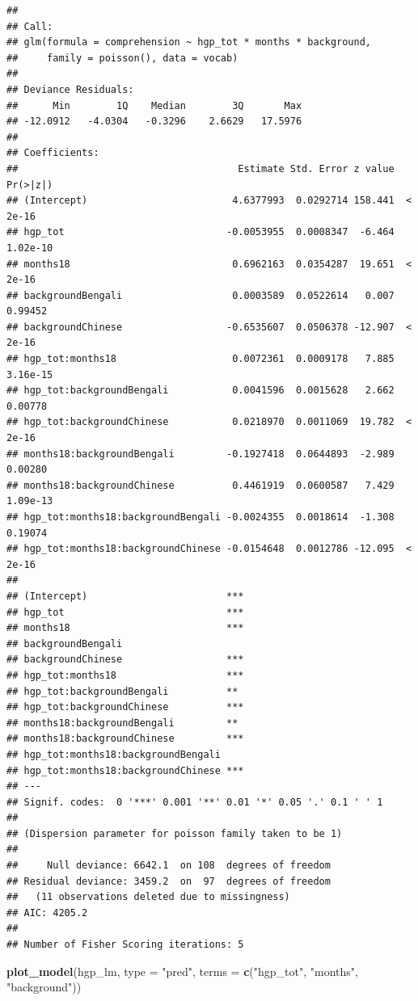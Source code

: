 \documentclass[]{article}
\newenvironment{Shaded}{\begin{snugshade}}{\end{snugshade}}
\newcommand{\DataTypeTok}[1]{\textcolor[rgb]{0.13,0.29,0.53}{#1}}
\newcommand{\KeywordTok}[1]{\textcolor[rgb]{0.13,0.29,0.53}{\textbf{#1}}}
\newcommand{\NormalTok}[1]{#1}
\newcommand{\StringTok}[1]{\textcolor[rgb]{0.31,0.60,0.02}{#1}}
\begin{document}
\begin{verbatim}
## 
## Call:
## glm(formula = comprehension ~ hgp_tot * months * background, 
##     family = poisson(), data = vocab)
## 
## Deviance Residuals: 
##      Min        1Q    Median        3Q       Max  
## -12.0912   -4.0304   -0.3296    2.6629   17.5976  
## 
## Coefficients:
##                                      Estimate Std. Error z value Pr(>|z|)
## (Intercept)                         4.6377993  0.0292714 158.441  < 2e-16
## hgp_tot                            -0.0053955  0.0008347  -6.464 1.02e-10
## months18                            0.6962163  0.0354287  19.651  < 2e-16
## backgroundBengali                   0.0003589  0.0522614   0.007  0.99452
## backgroundChinese                  -0.6535607  0.0506378 -12.907  < 2e-16
## hgp_tot:months18                    0.0072361  0.0009178   7.885 3.16e-15
## hgp_tot:backgroundBengali           0.0041596  0.0015628   2.662  0.00778
## hgp_tot:backgroundChinese           0.0218970  0.0011069  19.782  < 2e-16
## months18:backgroundBengali         -0.1927418  0.0644893  -2.989  0.00280
## months18:backgroundChinese          0.4461919  0.0600587   7.429 1.09e-13
## hgp_tot:months18:backgroundBengali -0.0024355  0.0018614  -1.308  0.19074
## hgp_tot:months18:backgroundChinese -0.0154648  0.0012786 -12.095  < 2e-16
##                                       
## (Intercept)                        ***
## hgp_tot                            ***
## months18                           ***
## backgroundBengali                     
## backgroundChinese                  ***
## hgp_tot:months18                   ***
## hgp_tot:backgroundBengali          ** 
## hgp_tot:backgroundChinese          ***
## months18:backgroundBengali         ** 
## months18:backgroundChinese         ***
## hgp_tot:months18:backgroundBengali    
## hgp_tot:months18:backgroundChinese ***
## ---
## Signif. codes:  0 '***' 0.001 '**' 0.01 '*' 0.05 '.' 0.1 ' ' 1
## 
## (Dispersion parameter for poisson family taken to be 1)
## 
##     Null deviance: 6642.1  on 108  degrees of freedom
## Residual deviance: 3459.2  on  97  degrees of freedom
##   (11 observations deleted due to missingness)
## AIC: 4205.2
## 
## Number of Fisher Scoring iterations: 5
\end{verbatim}

\begin{Shaded}
\begin{Highlighting}[]
\KeywordTok{plot_model}\NormalTok{(hgp_lm, }\DataTypeTok{type =} \StringTok{"pred"}\NormalTok{, }\DataTypeTok{terms =} \KeywordTok{c}\NormalTok{(}\StringTok{"hgp_tot"}\NormalTok{, }\StringTok{"months"}\NormalTok{, }\StringTok{"background"}\NormalTok{))}
\end{Highlighting}
\end{Shaded}
\end{document}
